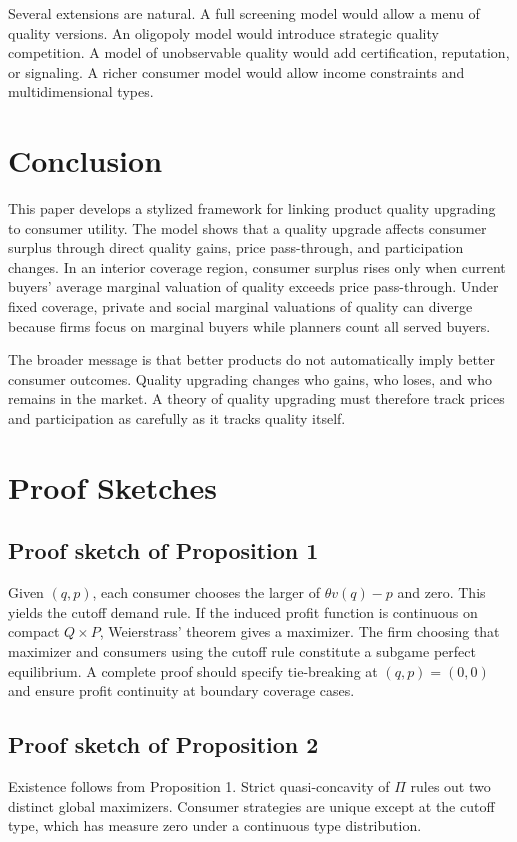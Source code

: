 \documentclass[12pt]{article}
\theoremstyle{plain}
\theoremstyle{definition}
\theoremstyle{remark}
\begin{document}
Several extensions are natural. A full screening model would allow a menu of quality versions. An oligopoly model would introduce strategic quality competition. A model of unobservable quality would add certification, reputation, or signaling. A richer consumer model would allow income constraints and multidimensional types.

\section{Conclusion}

This paper develops a stylized framework for linking product quality upgrading to consumer utility. The model shows that a quality upgrade affects consumer surplus through direct quality gains, price pass-through, and participation changes. In an interior coverage region, consumer surplus rises only when current buyers' average marginal valuation of quality exceeds price pass-through. Under fixed coverage, private and social marginal valuations of quality can diverge because firms focus on marginal buyers while planners count all served buyers.

The broader message is that better products do not automatically imply better consumer outcomes. Quality upgrading changes who gains, who loses, and who remains in the market. A theory of quality upgrading must therefore track prices and participation as carefully as it tracks quality itself.

\appendix
\section{Proof Sketches}

\subsection*{Proof sketch of Proposition 1}
Given $(q,p)$, each consumer chooses the larger of $\theta v(q)-p$ and zero. This yields the cutoff demand rule. If the induced profit function is continuous on compact $Q\times P$, Weierstrass' theorem gives a maximizer. The firm choosing that maximizer and consumers using the cutoff rule constitute a subgame perfect equilibrium. A complete proof should specify tie-breaking at $(q,p)=(0,0)$ and ensure profit continuity at boundary coverage cases.

\subsection*{Proof sketch of Proposition 2}
Existence follows from Proposition 1. Strict quasi-concavity of $\Pi$ rules out two distinct global maximizers. Consumer strategies are unique except at the cutoff type, which has measure zero under a continuous type distribution.
\end{document}

